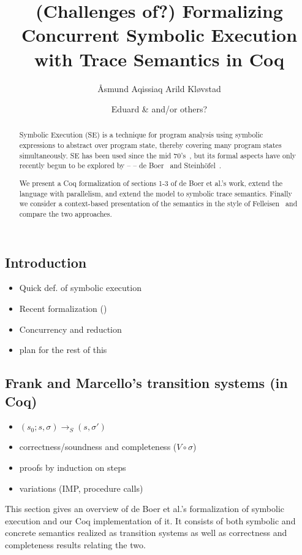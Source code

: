 \documentclass[submission,copyright,creativecommons]{eptcs}
\title{(Challenges of?) Formalizing Concurrent Symbolic Execution with Trace Semantics in Coq}
\author{Åsmund Aqissiaq Arild Kløvstad
\institute{UiO\\ Oslo, Norway}
\institute{Institute of Informatics}
\institute{\note{PSY, maybe?}}
\email{aaklovst@ifi.uio.no}
\and
Eduard \& and/or others?
\institute{UiO\\ Oslo, Norway}
\institute{Institute of Informatics}
\institute{PSY, maybe?}
}
\newcommand{\note}[1]{\color{WildStrawberry}{#1}\color{black}}
\begin{document}
\maketitle

\begin{abstract}
  Symbolic Execution (SE) is a technique for program analysis using symbolic expressions to abstract over program state,
  thereby covering many program states simultaneously. SE has been used since the mid 70's~\cite{king1976symbolic,boyer1975select},
  but its formal aspects have only recently begun to be explored by -- \note{among others} -- de Boer~\cite{boer2021} and Steinhöfel~\cite{steinhofel2020abstract}.

  \note{Something about trace semantics}

  We present a Coq formalization of sections 1-3 of de Boer et al.'s work, extend the language with parallelism, and
  extend the model to symbolic trace semantics. Finally we consider a context-based presentation of the semantics
  in the style of Felleisen~\cite{FELLEISEN1992235} and compare the two approaches.
\end{abstract}

\subsection*{Introduction}
\begin{itemize}
  \item Quick def. of symbolic execution
  \item Recent formalization (\cite{boer2021})
  \item Concurrency and reduction
  \item plan for the rest of this
\end{itemize}

\subsection*{Frank and Marcello's transition systems (in Coq)}
\note{This ends up rehashing a lot and taking a lot of space.
  Can I say ``just go read Frank and Marcello's paper'' and/or just list definitions?}
\begin{itemize}
  \item $(s_{0} ; s, \sigma) \rightarrow_{S} (s, \sigma')$
  \item correctness/soundness and completeness ($V \circ \sigma$)
  \item proofs by induction on steps
  \item variations (IMP, procedure calls)
\end{itemize}
This section gives an overview of de Boer et al.'s formalization of symbolic execution
and our Coq implementation of it. It consists of both symbolic and concrete semantics
realized as transition systems as well as correctness and completeness results relating the two.
\end{document}
